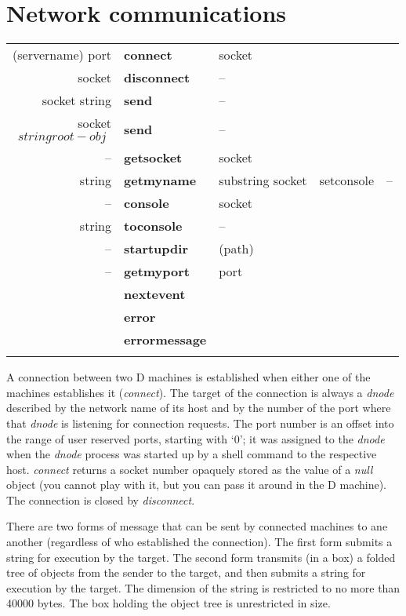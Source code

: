 \section{Network communications}

\begin{tabular}{>{\sffamily}r>{\sffamily\bfseries}l>{\sffamily}l}
(servername) port & connect & socket\\
socket & disconnect & --\\
socket string & send & --\\
socket \[ string root-obj \] & send & --\\
-- & getsocket & socket\\
string & getmyname & substring
socket & setconsole & --\\
-- & console & socket\\
string & toconsole & --\\
-- & startupdir & (path)\\
-- & getmyport & port\\
& nextevent & \\
& error & \\
& errormessage & \\\\
\end{tabular}

A connection between two D machines is established when either one of the machines establishes it (\emph{connect}). The target of the connection is always a \emph{dnode} described by the network name of its host and by the number of the port where that \emph{dnode} is listening for connection requests. The port number is an offset into the range of user reserved ports, starting with `0'; it was assigned to the \emph{dnode} when the \emph{dnode} process was started up by a shell command to the respective host. \emph{connect} returns a socket number opaquely stored as the value of a \emph{null} object (you cannot play with it, but you can pass it around in the D machine). The connection is closed by \emph{disconnect}.

There are two forms of message that can be sent by connected machines to ane another (regardless of who established the connection). The first form submits a string for execution by the target. The second form transmits (in a box) a folded tree of objects from the sender to the target, and then submits a string for execution by the target. The dimension of the string is restricted to no more than 40000 bytes. The box holding the object tree is unrestricted in size.

